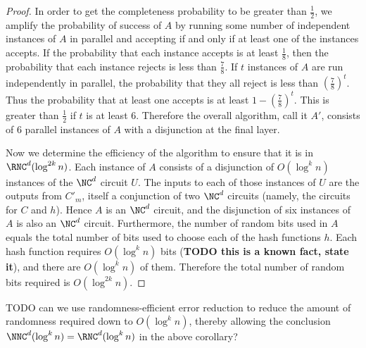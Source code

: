 \documentclass{article}
\begin{document}
\begin{proof}
  In order to get the completeness probability to be greater than $\frac{1}{2}$, we amplify the probability of success of $A$ by running some number of independent instances of $A$ in parallel and accepting if and only if at least one of the instances accepts.
  If the probability that each instance accepts is at least $\frac{1}{8}$, then the probability that each instance rejects is less than $\frac{7}{8}$.
  If $t$ instances of $A$ are run independently in parallel, the probability that they all reject is less than $(\frac{7}{8})^t$.
  Thus the probability that at least one accepts is at least $1 - (\frac{7}{8})^t$.
  This is greater than $\frac{1}{2}$ if $t$ is at least 6.
  Therefore the overall algorithm, call it $A'$, consists of 6 parallel instances of $A$ with a disjunction at the final layer.

  Now we determine the efficiency of the algorithm to ensure that it is in $\RNC^d(\log^{2k} n)$.
  Each instance of $A$ consists of a disjunction of $O(\log^k n)$ instances of the $\NC^d$ circuit $U$.
  The inputs to each of those instances of $U$ are the outputs from $C'_m$, itself a conjunction of two $\NC^d$ circuits (namely, the circuits for $C$ and $h$).
  Hence $A$ is an $\NC^d$ circuit, and the disjunction of six instances of $A$ is also an $\NC^d$ circuit.
  Furthermore, the number of random bits used in $A$ equals the total number of bits used to choose each of the hash functions $h$.
  Each hash function requires $O(\log^k n)$ bits (\textbf{TODO this is a known fact, state it}), and there are $O(\log^k n)$ of them.
  Therefore the total number of random bits required is $O(\log^{2k} n)$.
\end{proof}

TODO can we use randomness-efficient error reduction to reduce the amount of randomness required down to $O(\log^k n)$, thereby allowing the conclusion $\NNC^d(\log^k n) = \RNC^d(\log^k n)$ in the above corollary?



\end{document}
